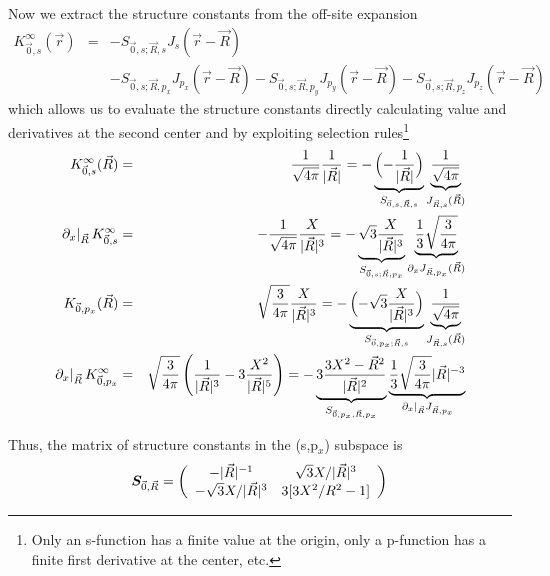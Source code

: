 \documentclass[11pt,a4paper]{report}
\begin{document}
Now we extract the structure constants from the off-site expansion
\begin{eqnarray}
K_{\vec{0},s}^\infty(\vec{r})&=&
-S_{\vec{0},s;\vec{R},s} J_s(\vec{r}-\vec{R}) 
\nonumber\\
&&-S_{\vec{0},s;\vec{R},p_x} J_{p_x}(\vec{r}-\vec{R}) 
-S_{\vec{0},s;\vec{R},p_y} J_{p_y}(\vec{r}-\vec{R}) 
-S_{\vec{0},s;\vec{R},p_z} J_{p_z}(\vec{r}-\vec{R}) 
\end{eqnarray}
which allows us to evaluate the structure constants directly
calculating value and derivatives at the second center and by
exploiting selection rules\footnote{Only an s-function has a finite
  value at the origin, only a p-function has a finite first derivative
  at the center, etc.}
\begin{eqnarray}
K_{\vec{0},s}^\infty(\vec{R})&=&\frac{1}{\sqrt{4\pi}}\frac{1}{|\vec{R}|}
=-
\underbrace{\Bigl(-\frac{1}{|\vec{R}|}\Bigr)}_{S_{\vec{0},s,\vec{R},s}}
\underbrace{\frac{1}{\sqrt{4\pi}}}_{J_{\vec{R},s}(\vec{R})} 
\\
\left.\partial_x\right|_{\vec{R}}K_{\vec{0},s}^\infty&=&
-\frac{1}{\sqrt{4\pi}}\frac{X}{|\vec{R}|^3}
=-
\underbrace{\sqrt{3}\frac{X}{|\vec{R}|^3}}_{S_{\vec{0},s;\vec{R},p_x}}
\underbrace{\frac{1}{3}\sqrt{\frac{3}{4\pi}}}_{\partial_x J_{\vec{R},p_x}(\vec{R})}
\\
K_{\vec{0},p_x}(\vec{R})&=&\sqrt{\frac{3}{4\pi}}\frac{X}{|\vec{R}|^3}
=-
\underbrace{\Bigl(-\sqrt{3}\frac{X}{|\vec{R}|^3}\Bigr)
}_{S_{\vec{0},p_x;\vec{R},s}}
\underbrace{\frac{1}{\sqrt{4\pi}}}_{J_{\vec{R},s}(\vec{R})}
\nonumber\\
\left.\partial_x\right|_{\vec{R}}K_{\vec{0},p_x}^\infty&=&
\sqrt{\frac{3}{4\pi}}
\left(\frac{1}{|\vec{R}|^3}-3\frac{X^2}{|\vec{R}|^5}\right)
=
-\underbrace{3\frac{3X^2-\vec{R}^2}{|\vec{R}|^2}}_{S_{\vec{0},p_x,\vec{R},p_x}}
\underbrace{\frac{1}{3}\sqrt{\frac{3}{4\pi}}|\vec{R}|^{-3}
}_{\left.\partial_x\right|_{\vec{R}} J_{\vec{R},p_x}}
\end{eqnarray}

Thus, the matrix of structure constants in the (s,p$_x$) subspace is
\begin{eqnarray}
\bm{S}_{\vec{0},\vec{R}}=\left(\begin{array}{cc}
-|\vec{R}|^{-1} & \sqrt{3}X/|\vec{R}|^3\\
-\sqrt{3}X/|\vec{R}|^3 & 
3[3X^2/R^2-1]\\
\end{array}\right)
\end{eqnarray}
\end{document}
